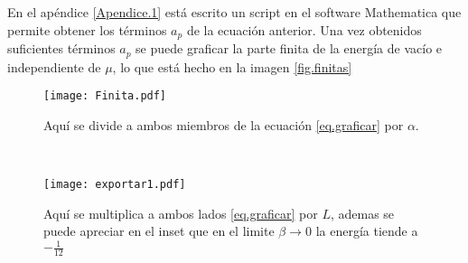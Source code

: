 En el apéndice \ref{Apendice.1} está escrito un script en el software Mathematica que permite obtener los términos $a _p$ de la ecuación anterior. 
Una vez obtenidos suficientes términos $a_p$ se puede graficar la parte finita de la energía de vacío e independiente de $\mu$, lo que está hecho en la imagen \ref{fig.finitas}



\begin{figure*}[t!]
    \centering
    \begin{subfigure}[t]{0.5\textwidth}
        \centering
        \texttt{[image: Finita.pdf]}
        \caption{Aquí se divide a ambos miembros de la ecuación \ref{eq.graficar} por $				\alpha$.}
        \label{fig.izquierda}
    \end{subfigure}%
    ~ 
    \begin{subfigure}[t]{0.5\textwidth}
        \centering
        \texttt{[image: exportar1.pdf]}
        \caption{Aquí se multiplica a ambos lados \ref{eq.graficar} por $L$, ademas 				se puede apreciar en el inset que en el limite $\beta \rightarrow 0$ la energía 		tiende a $- \frac{1}{12}$}
        \label{fig.derecha}
    \end{subfigure}
    \caption{En esta imagen se muestran dos posibles adimensionalizaciones de la ecuación \ref{eq.graficar}, que representan la energía de vacío independiente de $\mu$ .}
\label{fig.finitas}
\end{figure*}


